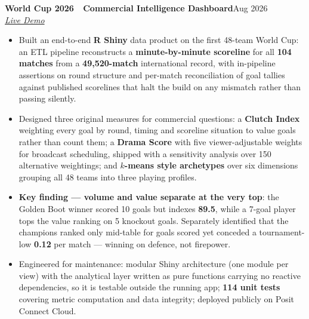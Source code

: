 \documentclass[11pt,letterpaper]{article}
\newcommand{\entry}[4]{%
  \noindent\textbf{\color{ink}#1}\hfill{\color{soft}\small #3}\\[1pt]%
  \textit{\color{muted}#2}\hfill\textit{\color{soft}\small #4}%
  \vspace{2pt}%
}
\begin{document}
\entry{World Cup 2026 \,\textemdash\, Commercial Intelligence Dashboard}{\href{https://019fc17e-1d8b-e115-70c7-734a309d5956.share.connect.posit.cloud/}{Live Demo}}{Aug 2026}{}
\begin{itemize}
  \item Built an end-to-end \textbf{R Shiny} data product on the first 48-team World Cup: an ETL pipeline reconstructs a \textbf{minute-by-minute scoreline} for all \textbf{104 matches} from a \textbf{49{,}520-match} international record, with in-pipeline assertions on round structure and per-match reconciliation of goal tallies against published scorelines that halt the build on any mismatch rather than passing silently.
  \item Designed three original measures for commercial questions: a \textbf{Clutch Index} weighting every goal by round, timing and scoreline situation to value goals rather than count them; a \textbf{Drama Score} with five viewer-adjustable weights for broadcast scheduling, shipped with a sensitivity analysis over 150 alternative weightings; and \textbf{$k$-means style archetypes} over six dimensions grouping all 48 teams into three playing profiles.
  \item \textbf{Key finding --- volume and value separate at the very top}: the Golden Boot winner scored 10 goals but indexes \textbf{89.5}, while a 7-goal player tops the value ranking on 5 knockout goals. Separately identified that the champions ranked only mid-table for goals scored yet conceded a tournament-low \textbf{0.12} per match --- winning on defence, not firepower.
  \item Engineered for maintenance: modular Shiny architecture (one module per view) with the analytical layer written as pure functions carrying no reactive dependencies, so it is testable outside the running app; \textbf{114 unit tests} covering metric computation and data integrity; deployed publicly on Posit Connect Cloud.
\end{itemize}
\end{document}
